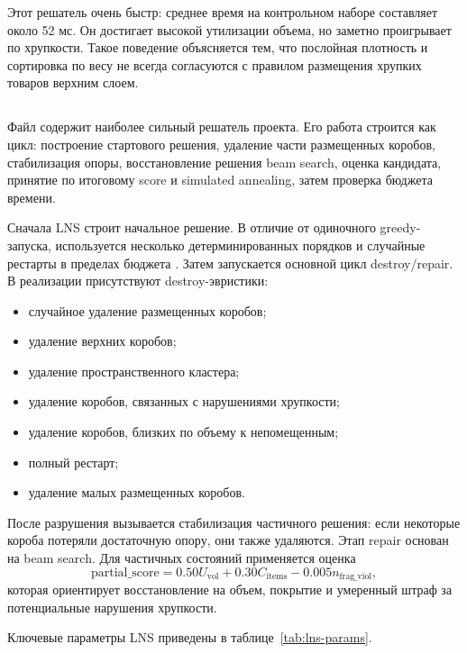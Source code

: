 Этот решатель очень быстр: среднее время на контрольном наборе составляет около 52 мс. Он достигает высокой утилизации объема, но заметно проигрывает по хрупкости. Такое поведение объясняется тем, что послойная плотность и сортировка по весу не всегда согласуются с правилом размещения хрупких товаров верхним слоем.

\subsection{}

Файл  содержит наиболее сильный решатель проекта. Его работа строится как цикл: построение стартового решения, удаление части размещенных коробов, стабилизация опоры, восстановление решения beam search, оценка кандидата, принятие по итоговому score и simulated annealing, затем проверка бюджета времени.

Сначала LNS строит начальное решение. В отличие от одиночного greedy-запуска, используется несколько детерминированных порядков и случайные рестарты в пределах бюджета . Затем запускается основной цикл destroy/repair. В реализации присутствуют destroy-эвристики:
\begin{itemize}
  \item случайное удаление размещенных коробов;
  \item удаление верхних коробов;
  \item удаление пространственного кластера;
  \item удаление коробов, связанных с нарушениями хрупкости;
  \item удаление коробов, близких по объему к непомещенным;
  \item полный рестарт;
  \item удаление малых размещенных коробов.
\end{itemize}

После разрушения вызывается стабилизация частичного решения: если некоторые короба потеряли достаточную опору, они также удаляются. Этап repair основан на beam search. Для частичных состояний применяется оценка
\begin{equation}
\mathrm{partial\_score}=0.50U_{\mathrm{vol}}+0.30C_{\mathrm{items}}-0.005n_{\mathrm{frag\_viol}},
\label{eq:partial}
\end{equation}
которая ориентирует восстановление на объем, покрытие и умеренный штраф за потенциальные нарушения хрупкости.

Ключевые параметры LNS приведены в таблице~\ref{tab:lns-params}.

